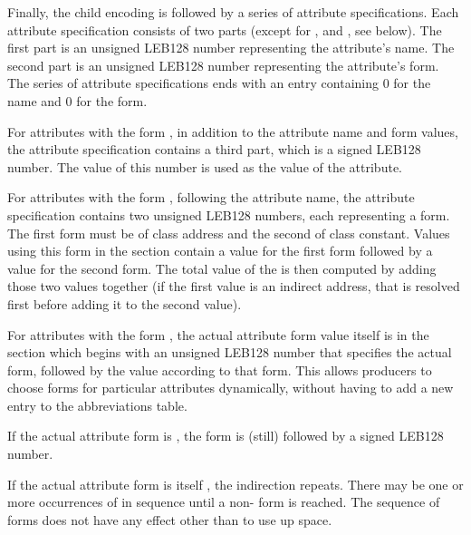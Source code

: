 Finally, the child encoding is followed by a series of
attribute specifications. Each attribute specification
consists of two parts
\bb
(except for \DWFORMimplicitconst{}, \DWFORMaddrxoffset{} 
and \DWFORMindirect{}, see below).
\eb
The first part is an 
unsigned LEB128
number representing the attribute\textquoteright s name. 
The second part is an 
unsigned LEB128 
number representing the attribute\textquoteright s form. 
The series of attribute specifications ends with an
entry containing 0 for the name and 0 for the form.

\bb
For attributes with the form \DWFORMimplicitconstTARG{},
in addition to the attribute name and form values,
\eb 
the attribute specification contains 
a third part, which is a signed LEB128 
number.
\label{datarep:attributeencodingsimplicitconst}
The value of this number is used as the value of the 
attribute.  

\bb
For attributes with the form \DWFORMaddrxoffsetTARG{}, following the
attribute name, the attribute specification contains 
two unsigned LEB128 numbers, each representing a form. The first 
form must be of class address and the second of class constant. Values 
using this form in the \dotdebuginfo{} section contain a value for the first 
form followed by a value for the second form. The total value of the 
\DWFORMaddrxoffsetNAME{} is then computed by adding those two values together 
(if the first value is an indirect address, that is resolved first 
before adding it to the second value).
\eb

\bb
For attributes with the form \DWFORMindirectTARG{}, 
the actual attribute form value itself is in the \dotdebuginfo{}
section which begins with an unsigned LEB128 number that 
specifies the actual form, followed by the value according to 
that form.
\eb
This allows producers to choose forms for particular attributes 
 dynamically, 
without having to add a new entry to the abbreviations table.

\bb
If the actual attribute form is \DWFORMimplicitconst, the form is 
(still) followed by a signed LEB128 number. 

If the actual attribute form is itself \DWFORMindirect, the indirection
repeats. There may be one or more occurrences of \DWFORMindirect{} in 
sequence until a non-\DWFORMindirect{} form is reached. The sequence of
\DWFORMindirect{} forms does not have any effect other than to use up 
space.
\eb

